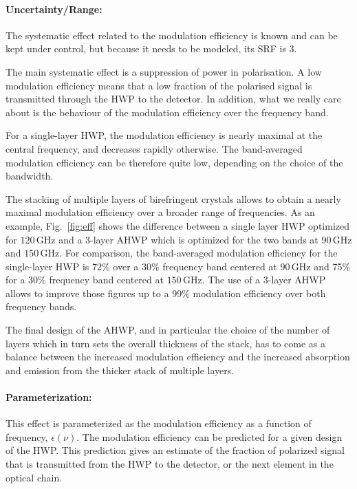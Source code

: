 \paragraph{Uncertainty/Range:}
The systematic effect related to the modulation efficiency is known and can be kept under control, but because it needs to be modeled, its SRF is 3.

The main systematic effect is a suppression of power in polarisation. A low modulation efficiency means that a low fraction of the polarised signal is transmitted through the HWP to the detector. In addition, what we really care about is the behaviour of the modulation efficiency over the frequency band.

For a single-layer HWP, the modulation efficiency is nearly maximal at the central frequency, and decreases rapidly otherwise. The band-averaged modulation efficiency can be therefore quite low, depending on the choice of the bandwidth.

The stacking of multiple layers of birefringent crystals allows to obtain a nearly maximal modulation efficiency over a broader range of frequencies. As an example, Fig.~\ref{fig:eff} shows the difference between a single layer HWP optimized for $120\,\mathrm{GHz}$ and a 3-layer AHWP which is optimized for the two bands at $90\,\mathrm{GHz}$ and $150\,\mathrm{GHz}$. For comparison, the band-averaged modulation efficiency for the single-layer HWP is 72\% over a 30\% frequency band centered at $90\,\mathrm{GHz}$ and 75\% for a 30\% frequency band centered at $150\,\mathrm{GHz}$. The use of a 3-layer AHWP allows to improve those figures up to a 99\% modulation efficiency over both frequency bands.

The final design of the AHWP, and in particular the choice of the number of layers which in turn sets the overall thickness of the stack, has to come as a balance between the increased modulation efficiency and the increased absorption and emission from the thicker stack of multiple layers.

\paragraph{Parameterization:}
This effect is parameterized as the modulation efficiency as a function of frequency, $\epsilon (\nu)$. The modulation efficiency can be predicted for a given design of the HWP. This prediction gives an estimate of the fraction of polarized signal that is transmitted from the HWP to the detector, or the next element in the optical chain.



